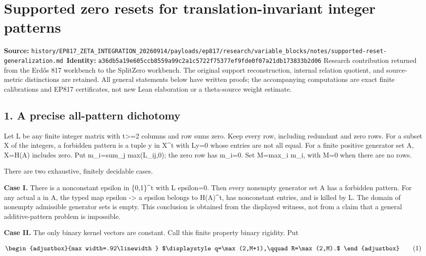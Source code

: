 \chapter{Supported zero resets for translation-invariant integer patterns}
\label{chapter:06_supported-reset-generalization}
{\small\noindent\textbf{Source:} \nolinkurl{history/EP817_ZETA_INTEGRATION_20260914/payloads/ep817/research/variable_blocks/notes/supported-reset-generalization.md}\
\textbf{Identity:} \nolinkurl{a36db5a19e605ccb8559a99c2a1c5722f75377ef9fde0f07a21db173833b2d06}}
\medskip
Research contribution returned from the Erdős 817 workbench to the SplitZero workbench. The original support reconstruction, internal relation quotient, and source-metric distinctions are retained. All general statements below have written proofs; the accompanying computations are exact finite calibrations and EP817 certificates, not new Lean elaboration or a theta-source weight estimate.

\section{1. A precise all-pattern dichotomy}\label{n06-a-precise-all-pattern-dichotomy}

Let L be any finite integer matrix with t\textgreater=2 columns and row sums zero. Keep every row, including redundant and zero rows. For a subset X of the integers, a forbidden pattern is a tuple y in X\^{}t with Ly=0 whose entries are not all equal. For a finite positive generator set A, X=H(A) includes zero. Put m\_i=sum\_j max(L\_ij,0); the zero row has m\_i=0. Set M=max\_i m\_i, with M=0 when there are no rows.

There are two exhaustive, finitely decidable cases.

\textbf{Case I.} There is a nonconstant epsilon in \{0,1\}\^{}t with L epsilon=0. Then every nonempty generator set A has a forbidden pattern. For any actual a in A, the typed map epsilon -\textgreater{} a epsilon belongs to H(A)\^{}t, has nonconstant entries, and is killed by L. The domain of nonempty admissible generator sets is empty. This conclusion is obtained from the displayed witness, not from a claim that a general additive-pattern problem is impossible.

\textbf{Case II.} The only binary kernel vectors are constant. Call this finite property binary rigidity. Put

\[
\begin{adjustbox}{max width=.92\linewidth}
$\displaystyle q=\max(2,M+1),\qquad R=\max(2,M).$
\end{adjustbox}
\tag{1}
\]

